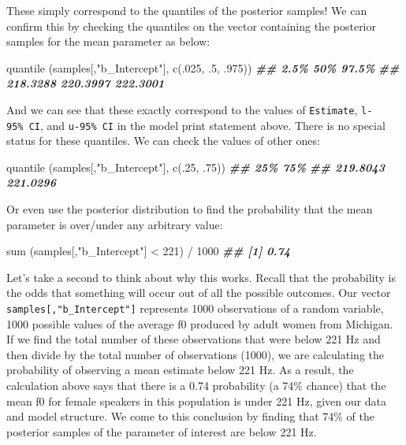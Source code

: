 \documentclass[
]{book}
\newenvironment{Shaded}{\begin{snugshade}}{\end{snugshade}}
\newcommand{\DecValTok}[1]{\textcolor[rgb]{0.00,0.00,0.81}{#1}}
\newcommand{\DocumentationTok}[1]{\textcolor[rgb]{0.56,0.35,0.01}{\textbf{\textit{#1}}}}
\newcommand{\FunctionTok}[1]{\textcolor[rgb]{0.00,0.00,0.00}{#1}}
\newcommand{\NormalTok}[1]{#1}
\newcommand{\SpecialCharTok}[1]{\textcolor[rgb]{0.00,0.00,0.00}{#1}}
\newcommand{\StringTok}[1]{\textcolor[rgb]{0.31,0.60,0.02}{#1}}
\begin{document}
These simply correspond to the quantiles of the posterior samples! We can confirm this by checking the quantiles on the vector containing the posterior samples for the mean parameter as below:

\begin{Shaded}
\begin{Highlighting}[]
\FunctionTok{quantile}\NormalTok{ (samples[,}\StringTok{"b\_Intercept"}\NormalTok{], }\FunctionTok{c}\NormalTok{(.}\DecValTok{025}\NormalTok{, .}\DecValTok{5}\NormalTok{, .}\DecValTok{975}\NormalTok{))}
\DocumentationTok{\#\#     2.5\%      50\%    97.5\% }
\DocumentationTok{\#\# 218.3288 220.3997 222.3001}
\end{Highlighting}
\end{Shaded}

And we can see that these exactly correspond to the values of \texttt{Estimate}, \texttt{l-95\%\ CI}, and \texttt{u-95\%\ CI} in the model print statement above. There is no special status for these quantiles. We can check the values of other ones:

\begin{Shaded}
\begin{Highlighting}[]
\FunctionTok{quantile}\NormalTok{ (samples[,}\StringTok{"b\_Intercept"}\NormalTok{], }\FunctionTok{c}\NormalTok{(.}\DecValTok{25}\NormalTok{, .}\DecValTok{75}\NormalTok{))}
\DocumentationTok{\#\#      25\%      75\% }
\DocumentationTok{\#\# 219.8043 221.0296}
\end{Highlighting}
\end{Shaded}

Or even use the posterior distribution to find the probability that the mean parameter is over/under any arbitrary value:

\begin{Shaded}
\begin{Highlighting}[]
\FunctionTok{sum}\NormalTok{ (samples[,}\StringTok{"b\_Intercept"}\NormalTok{] }\SpecialCharTok{\textless{}} \DecValTok{221}\NormalTok{) }\SpecialCharTok{/} \DecValTok{1000}
\DocumentationTok{\#\# [1] 0.74}
\end{Highlighting}
\end{Shaded}

Let's take a second to think about why this works. Recall that the probability is the odds that something will occur out of all the possible outcomes. Our vector \texttt{samples{[},"b\_Intercept"{]}} represents 1000 observations of a random variable, 1000 possible values of the average f0 produced by adult women from Michigan. If we find the total number of these observations that were below 221 Hz and then divide by the total number of observations (1000), we are calculating the probability of observing a mean estimate below 221 Hz. As a result, the calculation above says that there is a 0.74 probability (a 74\% chance) that the mean f0 for female speakers in this population is under 221 Hz, given our data and model structure. We come to this conclusion by finding that 74\% of the posterior samples of the parameter of interest are below 221 Hz.
\end{document}
